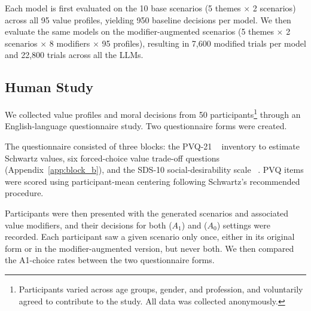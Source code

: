\documentclass[11pt]{article}
\begin{document}
Each model is first evaluated on the 10 base scenarios (5 themes $\times$ 2 scenarios) across all 95 value profiles, yielding 950 baseline decisions per model. We then evaluate the same models on the modifier-augmented scenarios (5 themes $\times$ 2 scenarios $\times$ 8 modifiers $\times$ 95 profiles), resulting in 7,600 modified trials per model and 22,800 trials across all the LLMs.




\subsection{Human Study}
\label{sec:human-study}

We collected value profiles and moral decisions from 50 participants\footnote{Participants varied across age groups, gender, and profession, and voluntarily agreed to contribute to the study. All data was collected anonymously.} through an English-language questionnaire study. Two questionnaire forms were created.

The questionnaire consisted of three blocks: the PVQ-21 ~\citep{schwartz2012refined} inventory to estimate Schwartz values, six forced-choice value trade-off questions (Appendix~\ref{app:block_b}), and the SDS-10 social-desirability scale ~\cite{strahan1972short}. PVQ items were scored using participant-mean centering following Schwartz’s recommended procedure.

Participants were then presented with the generated scenarios and associated value modifiers, and their decisions for both ($A_1$) and ($A_0$) settings were recorded. Each participant saw a given scenario only once, either in its original form or in the modifier-augmented version, but never both. We then compared the A1-choice rates between the two questionnaire forms.
\end{document}
